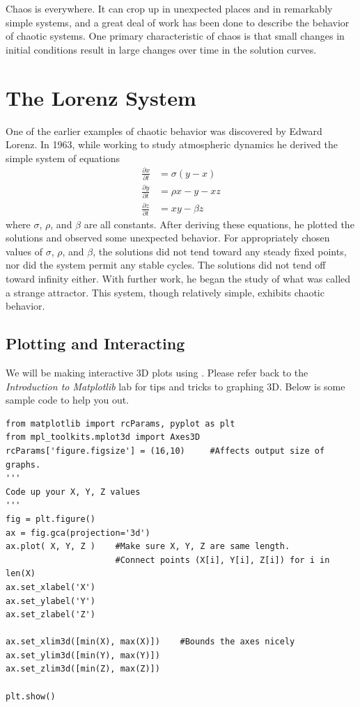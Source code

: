
Chaos is everywhere.
It can crop up in unexpected places and in remarkably simple systems, and a great deal of work has been done to describe the behavior of chaotic systems.
One primary characteristic of chaos is that small changes in initial conditions result in large changes over time in the solution curves.

\section*{The Lorenz System}
One of the earlier examples of chaotic behavior was discovered by Edward Lorenz.
In 1963, while working to study atmospheric dynamics he derived the simple system of equations
\begin{align*}
\frac{\partial x}{\partial t} &= \sigma \left(y - x\right) \\
\frac{\partial y}{\partial t} &= \rho x - y - x z \\
\frac{\partial z}{\partial t} &= x y - \beta z
\end{align*}
where $\sigma$, $\rho$, and $\beta$ are all constants.
After deriving these equations, he plotted the solutions and observed some unexpected behavior.
For appropriately chosen values of $\sigma$, $\rho$, and $\beta$, the solutions did not tend toward any steady fixed points, nor did the system permit any stable cycles.
The solutions did not tend off toward infinity either.
With further work, he began the study of what was called a strange attractor.
This system, though relatively simple, exhibits chaotic behavior.

\subsection*{Plotting and Interacting}
We will be making interactive 3D plots using .
Please refer back to the \textit{Introduction to Matplotlib} lab for tips and tricks to graphing 3D.
Below is some sample code to help you out.

\begin{lstlisting}
from matplotlib import rcParams, pyplot as plt
from mpl_toolkits.mplot3d import Axes3D
rcParams['figure.figsize'] = (16,10)     #Affects output size of graphs.
'''
Code up your X, Y, Z values
'''
fig = plt.figure()
ax = fig.gca(projection='3d')
ax.plot( X, Y, Z )    #Make sure X, Y, Z are same length.
                      #Connect points (X[i], Y[i], Z[i]) for i in len(X)
ax.set_xlabel('X')
ax.set_ylabel('Y')
ax.set_zlabel('Z')

ax.set_xlim3d([min(X), max(X)])    #Bounds the axes nicely
ax.set_ylim3d([min(Y), max(Y)])
ax.set_zlim3d([min(Z), max(Z)])

plt.show()
\end{lstlisting}

